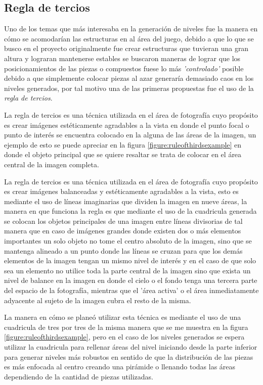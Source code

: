 \subsection{Regla de tercios}
\label{subsection:ruleofthirds}

Uno de los temas que más interesaba en la generación de niveles fue la manera en
cómo se acomodarían las estructuras en al área del juego, debido a que lo que se
busco en el proyecto originalmente fue crear estructuras que tuvieran una gran
altura y lograran mantenerse estables se buscaron maneras de lograr que los
posicionamientos de las piezas o compuestos fuese lo más \textit{'controlado'}
posible debido a que simplemente colocar piezas al azar generaría demasiado caos
en los niveles generados, por tal motivo una de las primeras propuestas fue el
uso de la \textit{regla de tercios}.

La regla de tercios es una técnica utilizada en el área de fotografía cuyo
propósito es crear imágenes estéticamente agradables a la vista en donde el
punto focal o punto de interés se encuentra colocado en la alguna de las áreas
de la imagen, un ejemplo de esto se puede apreciar en la figura
\ref{figure:ruleofthirdsexample} en donde el objeto principal que se quiere
resaltar se trata de colocar en el área central de la imagen completa.

La regla de tercios es una técnica utilizada en el área de fotografía cuyo
propósito es crear imágenes balanceadas y estéticamente agradables a la vista,
esto es mediante el uso de líneas imaginarias que dividen la imagen en nueve
áreas, la manera en que funciona la regla es que mediante el uso de la
cuadricula generada se colocan los objetos principales de una imagen entre
líneas divisorias de tal manera que en caso de imágenes grandes donde existen dos
o más elementos importantes un solo objeto no tome el centro absoluto de la
imagen, sino que se mantenga alineado a un punto donde las líneas se cruzan para
que los demás elementos de la imagen tengan un mismo nivel de interés y en el
caso de que solo sea un elemento no utilice toda la parte central de la imagen
sino que exista un nivel de balance en la imagen en donde el cielo o el fondo
tenga una tercera parte del espacio de la fotografía, mientras que el 'área
activa' o el área inmediatamente adyacente al sujeto de la imagen cubra el
resto de la misma.

La manera en cómo se planeó utilizar esta técnica es mediante el uso de una
cuadricula de tres por tres de la misma manera que se me muestra en la figura
\ref{figure:ruleofthirdsexample}, pero en el caso de los niveles generados se
espera utilizar la cuadricula para rellenar áreas del nivel iniciando desde la
parte inferior para generar niveles más robustos en sentido de que la
distribución de las piezas es más enfocada al centro creando una pirámide o
llenando todas las áreas dependiendo de la cantidad de piezas utilizadas. 

